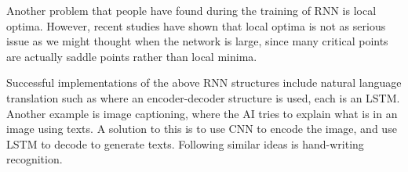 Another problem that people have found during the training of RNN is local optima. However, recent studies have shown that local optima is not as serious issue as we might thought when the network is large, since many critical points are actually saddle points rather than local minima.

Successful implementations of the above RNN structures include natural language translation such as \cite{sutskever2014sequence} where an encoder-decoder structure is used, each is an LSTM. Another example is image captioning, where the AI tries to explain what is in an image using texts. A solution to this is to use CNN to encode the image, and use LSTM to decode to generate texts. Following similar ideas is hand-writing recognition. 